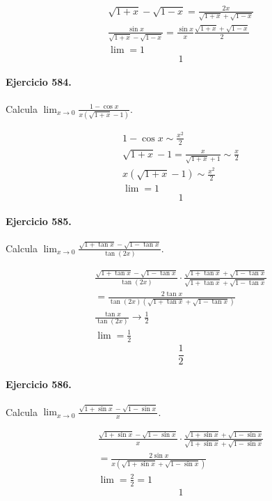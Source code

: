 \documentclass[11pt,a4paper]{article}
\begin{document}
\[
\begin{aligned}
\sqrt{1+x}-\sqrt{1-x}=\frac{2x}{\sqrt{1+x}+\sqrt{1-x}}\\
\frac{\sin x}{\sqrt{1+x}-\sqrt{1-x}}=\frac{\sin x}{x}\frac{\sqrt{1+x}+\sqrt{1-x}}{2}\\
\lim=1
\end{aligned}
\]
\[\boxed{1}\]


\paragraph{Ejercicio 584.} Calcula $\displaystyle \lim_{x\to0}\frac{1-\cos x}{x(\sqrt{1+x}-1)}$.

\[
\begin{aligned}
1-\cos x\sim\frac{x^2}{2}\\
\sqrt{1+x}-1=\frac{x}{\sqrt{1+x}+1}\sim\frac{x}{2}\\
x(\sqrt{1+x}-1)\sim\frac{x^2}{2}\\
\lim=1
\end{aligned}
\]
\[\boxed{1}\]


\paragraph{Ejercicio 585.} Calcula $\displaystyle \lim_{x\to0}\frac{\sqrt{1+\tan x}-\sqrt{1-\tan x}}{\tan(2x)}$.

\[
\begin{aligned}
\frac{\sqrt{1+\tan x}-\sqrt{1-\tan x}}{\tan(2x)}\cdot\frac{\sqrt{1+\tan x}+\sqrt{1-\tan x}}{\sqrt{1+\tan x}+\sqrt{1-\tan x}}\\
=\frac{2\tan x}{\tan(2x)(\sqrt{1+\tan x}+\sqrt{1-\tan x})}\\
\frac{\tan x}{\tan(2x)}\to\frac12\\
\lim=\frac12
\end{aligned}
\]
\[\boxed{\frac12}\]


\paragraph{Ejercicio 586.} Calcula $\displaystyle \lim_{x\to0}\frac{\sqrt{1+\sin x}-\sqrt{1-\sin x}}{x}$.

\[
\begin{aligned}
\frac{\sqrt{1+\sin x}-\sqrt{1-\sin x}}{x}\cdot\frac{\sqrt{1+\sin x}+\sqrt{1-\sin x}}{\sqrt{1+\sin x}+\sqrt{1-\sin x}}\\
=\frac{2\sin x}{x(\sqrt{1+\sin x}+\sqrt{1-\sin x})}\\
\lim=\frac{2}{2}=1
\end{aligned}
\]
\[\boxed{1}\]
\end{document}
